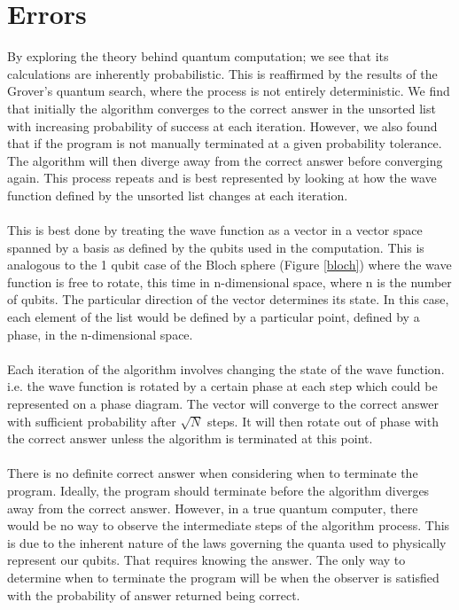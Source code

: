 \documentclass[12pt]{report}
\begin{document}
\section{Errors}
By exploring the theory behind quantum computation; we see that its calculations are inherently probabilistic.  This is reaffirmed by the results of the Grover's quantum search, where the process is not entirely deterministic.  We find that initially the algorithm converges to the correct answer in the unsorted list with increasing probability of success at each iteration.  However, we also found that if the program is not manually terminated at a given probability tolerance. The algorithm will then diverge away from the correct answer before converging again.  This process repeats and is best represented by looking at how the wave function defined by the unsorted list changes at each iteration.  \\ \\
This is best done by treating the wave function as a vector in a vector space spanned by a basis as defined by the qubits used in the computation.  This is analogous to the 1 qubit case of the Bloch sphere (Figure \ref{bloch}) where the wave function is free to rotate, this time in n-dimensional space, where n is the number of qubits.  The particular direction of the vector determines its state.  In this case, each element of the list would be defined by a particular point, defined by a phase, in the n-dimensional space. \\ \\ 
Each iteration of the algorithm involves changing the state of the wave function.  i.e. the wave function is rotated by a certain phase at each step which could be represented on a phase diagram.  The vector will converge to the correct answer with sufficient probability after $\sqrt{N}$ steps. It will then rotate out of phase with the correct answer unless the algorithm is terminated at this point. \\ \\ 
There is no definite correct answer when considering when to terminate the program.  Ideally, the program should terminate before the algorithm diverges away from the correct answer.  However, in a true quantum computer, there would be no way to observe the intermediate steps of the algorithm process. This is due to the inherent nature of the laws governing the quanta used to physically represent our qubits. That requires knowing the answer. The only way to determine when to terminate the program will be when the observer is satisfied with the probability of answer returned being correct. 
\end{document}

